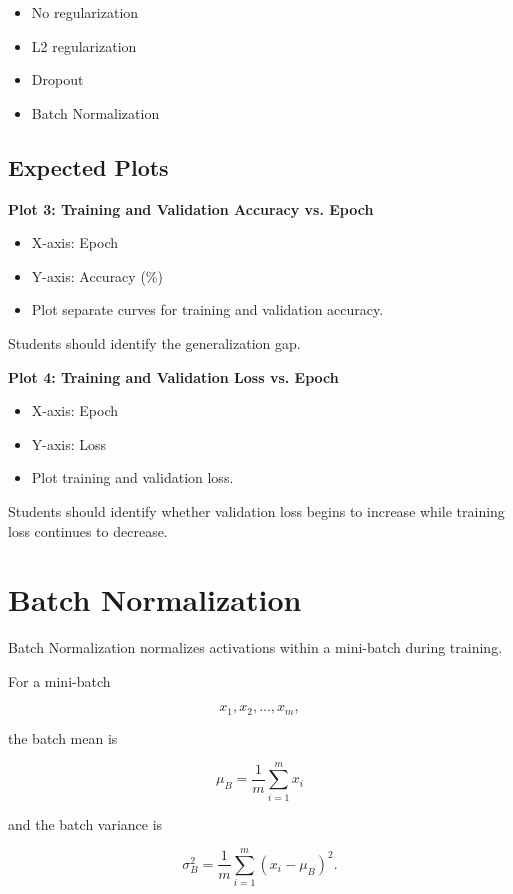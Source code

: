 \documentclass[10pt]{article}
\begin{document}
\begin{itemize}
\item No regularization
\item L2 regularization
\item Dropout
\item Batch Normalization
\end{itemize}

\subsection*{Expected Plots}

\textbf{Plot 3: Training and Validation Accuracy vs. Epoch}

\begin{itemize}
\item X-axis: Epoch
\item Y-axis: Accuracy (\%)
\item Plot separate curves for training and validation accuracy.
\end{itemize}

Students should identify the generalization gap.

\textbf{Plot 4: Training and Validation Loss vs. Epoch}

\begin{itemize}
\item X-axis: Epoch
\item Y-axis: Loss
\item Plot training and validation loss.
\end{itemize}

Students should identify whether validation loss begins to increase while
training loss continues to decrease.

\section{Batch Normalization}

Batch Normalization normalizes activations within a mini-batch during
training.

For a mini-batch

\[
x_1,x_2,\ldots,x_m,
\]

the batch mean is

\[
\mu_B=\frac{1}{m}\sum_{i=1}^{m}x_i
\]

and the batch variance is

\[
\sigma_B^2=
\frac{1}{m}\sum_{i=1}^{m}(x_i-\mu_B)^2.
\]
\end{document}
